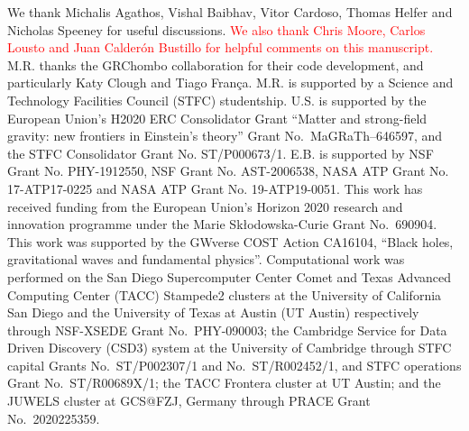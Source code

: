 \documentclass[floats,floatfix,showpacs,amssymb,prd,twocolumn,superscriptaddress,nofootinbib,nolongbibliography,reprint]{revtex4-2}
\newcommand{\mr}[1]{{\textcolor{cyan}{\sf{[MR: #1]}} }}
\newcommand{\eb}[1]{{\textcolor{blue}{\sf{[EB: #1]}} }}
\newcommand{\new}[1]{{\textcolor{red}{ #1} }}
\begin{document}
\begin{acknowledgements}
We thank Michalis Agathos, Vishal Baibhav, Vitor Cardoso, Thomas
Helfer and Nicholas Speeney for useful discussions. 
\new{We also thank Chris Moore, Carlos Lousto and Juan Calder\'on 
Bustillo for helpful comments on this manuscript.}
M.R. thanks the
GRChombo collaboration \cite{GRChomboWebsite} for their code
development, and particularly Katy Clough and Tiago Fran\c{c}a. M.R. is
supported by a Science and Technology Facilities Council (STFC)
studentship. U.S. is supported by the European Union’s H2020 ERC
Consolidator Grant ``Matter and strong-field gravity: new frontiers in
Einstein's theory'' Grant No.~MaGRaTh--646597, and the STFC
Consolidator Grant No. ST/P000673/1. E.B. is supported by NSF Grant
No. PHY-1912550, NSF Grant No. AST-2006538, NASA ATP Grant No.
17-ATP17-0225 and NASA ATP Grant No. 19-ATP19-0051. This work has
received funding from the European Union's Horizon 2020 research and
innovation programme under the Marie Sk\l odowska-Curie Grant
No.~690904. This work was supported by the GWverse COST Action
CA16104, ``Black holes, gravitational waves and fundamental physics''.
%
Computational work was performed on
the San Diego Supercomputer Center Comet and Texas Advanced Computing 
Center (TACC) Stampede2 clusters at the University of California San Diego 
and the University of Texas at Austin (UT Austin) respectively through
NSF-XSEDE Grant No.~PHY-090003; the Cambridge Service for Data 
Driven Discovery (CSD3) system at the University of Cambridge 
through STFC capital Grants No.~ST/P002307/1 and No.~ST/R002452/1,
and STFC operations Grant No.~ST/R00689X/1;
the TACC Frontera cluster at UT Austin; and
the JUWELS cluster at GCS@FZJ, Germany through PRACE Grant No.~2020225359.

\end{acknowledgements}
\appendix
\end{document}
